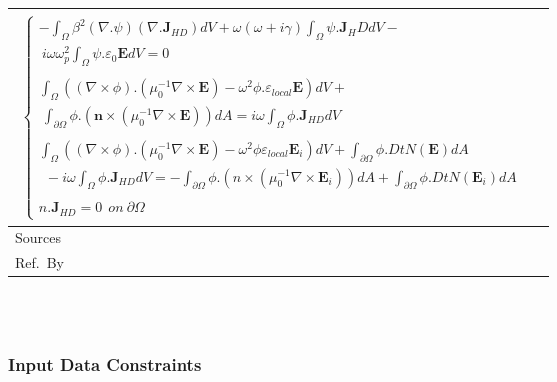 \documentclass[12pt]{article}
\newcommand{\colBwidth}{0.82\textwidth} \newcommand{\colCwidth}{0.1\textwidth}
\begin{document}
\begin{minipage}{\textwidth}
\begin{tabular}{| p{\colAwidth} |
				p{\colBwidth}|}
\begin{equation}
\begin{gathered}
\begin{cases}
						-\int_\Omega
						\beta^2(\nabla.\psi)(\nabla.\textbf{J}_{HD})dV+\omega(\omega+i\gamma)\int_{\Omega} \psi. \textbf{J}_HD dV - \\ \ i\omega \omega^2_p \int_\Omega \psi.\varepsilon_{0}\textbf{E}dV = 0 \\
						
						\\ \int_\Omega ((\nabla \times \phi) . (\mu^{-1}_0 \nabla \times
						\textbf{E})-\omega^2 \phi.\varepsilon_{local} \textbf{E}) dV + \\ \
						\int_{\partial \Omega} \phi.(\textbf{n} \times (\mu^{-1}_0 \nabla \times
						\textbf{E}))dA = i\omega \int_\Omega \phi. \textbf{J}_{HD} dV
						
						\\ \\ \int_\Omega ((\nabla \times \phi).(\mu^{-1}_{0} \nabla \times
						\textbf{E})- \omega^2\phi \varepsilon_{local} \textbf{E}_i)dV +
						\int_{\partial \Omega} \phi . DtN(\textbf{E})dA\\ \ \ - i\omega
						\int_\Omega \phi . \textbf{J}_{HD}dV =  -\int_{\partial \Omega} \phi.(n
						\times (\mu^{-1}_0 \nabla \times \textbf{E}_i))dA + \int_{\partial \Omega}
						\phi.DtN(\textbf{E}_i)dA \\ \\ n.\textbf{J}_{HD}=0 \ \ on \ \partial
						\Omega \end{cases} \end{gathered} \end{equation} \\ \hline Sources&
			\cite{hiremath2012numerical}\\ \hline Ref.\ By & \\ \hline \end{tabular}
	\end{minipage}\\
	
	
	
	~\newline
	
	
	
	
	\subsubsection{Input Data Constraints} \label{sec_DataConstraints}
	
\end{document}
